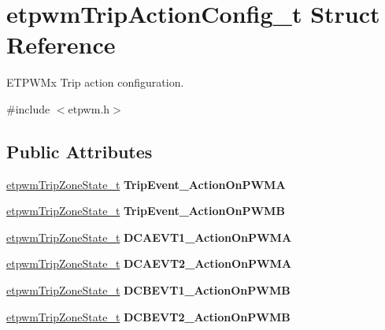 \hypertarget{structetpwmTripActionConfig__t}{}\section{etpwm\+Trip\+Action\+Config\+\_\+t Struct Reference}
\label{structetpwmTripActionConfig__t}


E\+T\+P\+W\+Mx Trip action configuration.  




{\ttfamily \#include $<$etpwm.\+h$>$}

\subsection*{Public Attributes}
\begin{DoxyCompactItemize}
\item 
\mbox{\label{structetpwmTripActionConfig__t_a7ebe0882e3d4130d1c52a3daff18cec1}} 
\mbox{\hyperlink{etpwm_8h_a5b052cb448b92356db9af191121dd803}{etpwm\+Trip\+Zone\+State\+\_\+t}} {\bfseries Trip\+Event\+\_\+\+Action\+On\+P\+W\+MA}
\item 
\mbox{\label{structetpwmTripActionConfig__t_a29c5e443e5dc60065239912085b20b85}} 
\mbox{\hyperlink{etpwm_8h_a5b052cb448b92356db9af191121dd803}{etpwm\+Trip\+Zone\+State\+\_\+t}} {\bfseries Trip\+Event\+\_\+\+Action\+On\+P\+W\+MB}
\item 
\mbox{\label{structetpwmTripActionConfig__t_a9e5626c1fd0a1983f27690e9a8cb30f5}} 
\mbox{\hyperlink{etpwm_8h_a5b052cb448b92356db9af191121dd803}{etpwm\+Trip\+Zone\+State\+\_\+t}} {\bfseries D\+C\+A\+E\+V\+T1\+\_\+\+Action\+On\+P\+W\+MA}
\item 
\mbox{\label{structetpwmTripActionConfig__t_a709439340984947b7d40ff0f0e122a09}} 
\mbox{\hyperlink{etpwm_8h_a5b052cb448b92356db9af191121dd803}{etpwm\+Trip\+Zone\+State\+\_\+t}} {\bfseries D\+C\+A\+E\+V\+T2\+\_\+\+Action\+On\+P\+W\+MA}
\item 
\mbox{\label{structetpwmTripActionConfig__t_a1d8663cadf076ee11b1c36cb9b5b8912}} 
\mbox{\hyperlink{etpwm_8h_a5b052cb448b92356db9af191121dd803}{etpwm\+Trip\+Zone\+State\+\_\+t}} {\bfseries D\+C\+B\+E\+V\+T1\+\_\+\+Action\+On\+P\+W\+MB}
\item 
\mbox{\label{structetpwmTripActionConfig__t_af7668afc0ea42c64e3f5db7e6b849b88}} 
\mbox{\hyperlink{etpwm_8h_a5b052cb448b92356db9af191121dd803}{etpwm\+Trip\+Zone\+State\+\_\+t}} {\bfseries D\+C\+B\+E\+V\+T2\+\_\+\+Action\+On\+P\+W\+MB}
\end{DoxyCompactItemize}


